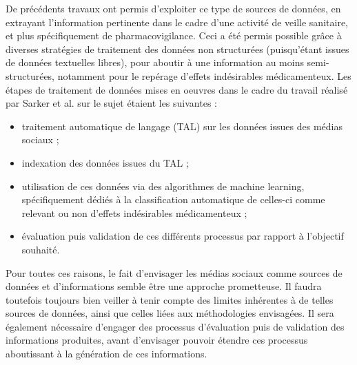 \documentclass[a4paper, 12pt, openany, oneside, abstract=on]{article} %
\begin{document}
De précédents travaux ont permis d'exploiter ce type de sources de données, en extrayant l'information pertinente dans le cadre d'une activité de veille sanitaire, et plus spécifiquement de pharmacovigilance. Ceci a été permis possible grâce à diverses stratégies de traitement des données non structurées (puisqu'étant issues de données textuelles libres), pour aboutir à une information au moins semi-structurées, notamment pour le repérage d'effets indésirables médicamenteux. Les étapes de traitement de données mises en oeuvres dans le cadre du travail réalisé par Sarker et al.\cite{Sarker2014} sur le sujet étaient les suivantes : 
\begin{itemize}
    \item traitement automatique de langage (TAL) sur les données issues des médias sociaux ;
    \item indexation des données issues du TAL ;
    \item utilisation de ces données via des algorithmes de machine learning, spécifiquement dédiés à la classification automatique de celles-ci comme relevant ou non d'effets indésirables médicamenteux ;
    \item évaluation puis validation de ces différents processus par rapport à l'objectif souhaité.
\end{itemize}

Pour toutes ces raisons, le fait d'envisager les médias sociaux comme sources de données et d'informations semble être une approche prometteuse. Il faudra toutefois toujours bien veiller à tenir compte des limites inhérentes à de telles sources de données, ainsi que celles liées aux méthodologies envisagées. Il sera également nécessaire d'engager des processus d'évaluation puis de validation des informations produites, avant d'envisager pouvoir étendre ces processus aboutissant à la génération de ces informations.
\end{document}
